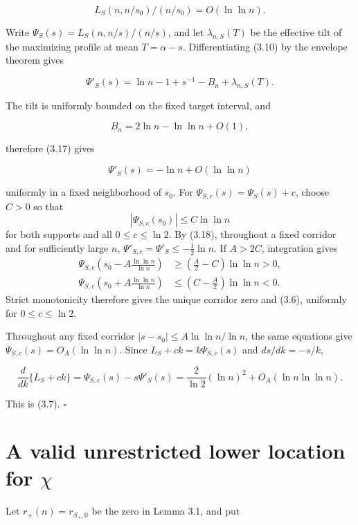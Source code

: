 \documentclass[11pt,reqno]{amsart}
\begin{document}
\[
 L_S(n,n/s_0)/(n/s_0)=O({\ln\ln n}).                              \tag{3.16}
\]

Write \(\Psi_S(s)=L_S(n,n/s)/(n/s)\), and let
\(\lambda_{n,S}(T)\) be the effective tilt of the maximizing profile at
mean \(T=\alpha-s\).  Differentiating (3.10) by the envelope theorem gives

\[
 \Psi'_S(s)
 ={\ln n}-1+s^{-1}-B_n+\lambda_{n,S}(T).
\]

The tilt is uniformly bounded on the fixed target interval, and

\[
 B_n=2{\ln n}-{\ln\ln n}+O(1),                                          \tag{3.17}
\]

therefore (3.17) gives

\[
 \Psi'_S(s)
 =-{\ln n}+O({\ln\ln n})                                                \tag{3.18}
\]

uniformly in a fixed neighborhood of \(s_0\). For
\(\Psi_{S,c}(s)=\Psi_S(s)+c\), choose \(C>0\) so that
\[
 |\Psi_{S,c}(s_0)|\le C\ln\ln n
\]
for both supports and all \(0\le c\le\ln 2\). By (3.18), throughout a
fixed corridor and for sufficiently large \(n\),
\(\Psi'_{S,c}=\Psi'_S\le-\tfrac12\ln n\). If \(A>2C\), integration gives
\[
\begin{aligned}
\Psi_{S,c}\!\left(s_0-A\frac{\ln\ln n}{\ln n}\right)
 &\ge \left(\frac A2-C\right)\ln\ln n>0,\\
\Psi_{S,c}\!\left(s_0+A\frac{\ln\ln n}{\ln n}\right)
 &\le \left(C-\frac A2\right)\ln\ln n<0.
\end{aligned}
\]
Strict monotonicity therefore gives the unique corridor zero and (3.6),
uniformly for \(0\le c\le\ln 2\).

Throughout any fixed corridor \(|s-s_0|\le A{\ln\ln n}/{\ln n}\), the same equations
give \(\Psi_{S,c}(s)=O_A({\ln\ln n})\). Since \(L_S+ck=k\Psi_{S,c}(s)\) and
\(ds/dk=-s/k\),

\[
 \frac{d}{dk}\{L_S+ck\}
 =\Psi_{S,c}(s)-s\Psi'_S(s)
 =\frac2{\ln 2}(\ln n)^2+O_A({\ln n}{\ln\ln n}).                                    \tag{3.19}
\]

This is (3.7). \(\square\)

\section{\texorpdfstring{A valid unrestricted lower location for
\(\chi\)}{A valid unrestricted lower location for chi}}\label{a-valid-unrestricted-lower-location-for-chi}

Let \(r_+(n)=r_{S_+,0}\) be the zero in Lemma 3.1, and put
\end{document}
